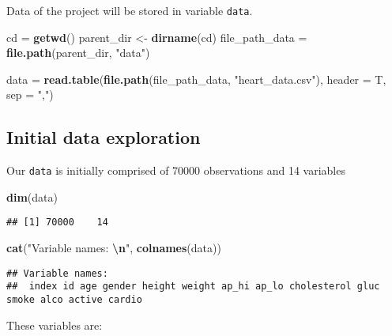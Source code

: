 \documentclass[
]{article}
\newenvironment{Shaded}{\begin{snugshade}}{\end{snugshade}}
\newcommand{\AttributeTok}[1]{\textcolor[rgb]{0.13,0.29,0.53}{#1}}
\newcommand{\FunctionTok}[1]{\textcolor[rgb]{0.13,0.29,0.53}{\textbf{#1}}}
\newcommand{\NormalTok}[1]{#1}
\newcommand{\OtherTok}[1]{\textcolor[rgb]{0.56,0.35,0.01}{#1}}
\newcommand{\SpecialCharTok}[1]{\textcolor[rgb]{0.81,0.36,0.00}{\textbf{#1}}}
\newcommand{\StringTok}[1]{\textcolor[rgb]{0.31,0.60,0.02}{#1}}
\begin{document}
Data of the project will be stored in variable \texttt{data}.

\begin{Shaded}
\begin{Highlighting}[]
\NormalTok{cd }\OtherTok{=} \FunctionTok{getwd}\NormalTok{()}
\NormalTok{parent\_dir }\OtherTok{\textless{}{-}} \FunctionTok{dirname}\NormalTok{(cd)}
\NormalTok{file\_path\_data }\OtherTok{=} \FunctionTok{file.path}\NormalTok{(parent\_dir, }\StringTok{"data"}\NormalTok{)}

\NormalTok{data }\OtherTok{=} \FunctionTok{read.table}\NormalTok{(}\FunctionTok{file.path}\NormalTok{(file\_path\_data, }\StringTok{"heart\_data.csv"}\NormalTok{), }\AttributeTok{header =}\NormalTok{ T, }\AttributeTok{sep =} \StringTok{","}\NormalTok{)}
\end{Highlighting}
\end{Shaded}

\hypertarget{initial-data-exploration}{%
\subsection{Initial data exploration}\label{initial-data-exploration}}

Our \texttt{data} is initially comprised of 70000 observations and 14
variables

\begin{Shaded}
\begin{Highlighting}[]
\FunctionTok{dim}\NormalTok{(data)}
\end{Highlighting}
\end{Shaded}

\begin{verbatim}
## [1] 70000    14
\end{verbatim}

\begin{Shaded}
\begin{Highlighting}[]
\FunctionTok{cat}\NormalTok{(}\StringTok{"Variable names: }\SpecialCharTok{\textbackslash{}n}\StringTok{"}\NormalTok{, }\FunctionTok{colnames}\NormalTok{(data))}
\end{Highlighting}
\end{Shaded}

\begin{verbatim}
## Variable names: 
##  index id age gender height weight ap_hi ap_lo cholesterol gluc smoke alco active cardio
\end{verbatim}

These variables are:
\end{document}
